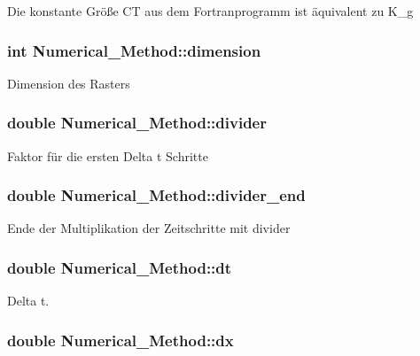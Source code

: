 Die konstante Größe C\-T aus dem Fortranprogramm ist äquivalent zu K\-\_\-g \hypertarget{classNumerical__Method_ae867f42bb0ab0d0bdfdc7d8301c3f45f}{
\subsubsection[{dimension}]{\setlength{\rightskip}{0pt plus 5cm}int Numerical\-\_\-\-Method\-::dimension}}\label{classNumerical__Method_ae867f42bb0ab0d0bdfdc7d8301c3f45f}
Dimension des Rasters \hypertarget{classNumerical__Method_a9767068bb9f5f20c83567f6c9c2ba314}{
\subsubsection[{divider}]{\setlength{\rightskip}{0pt plus 5cm}double Numerical\-\_\-\-Method\-::divider}}\label{classNumerical__Method_a9767068bb9f5f20c83567f6c9c2ba314}
Faktor für die ersten Delta t Schritte \hypertarget{classNumerical__Method_a914fcf77b93b98de47e5535dde982f6b}{
\subsubsection[{divider\-\_\-end}]{\setlength{\rightskip}{0pt plus 5cm}double Numerical\-\_\-\-Method\-::divider\-\_\-end}}\label{classNumerical__Method_a914fcf77b93b98de47e5535dde982f6b}
Ende der Multiplikation der Zeitschritte mit divider \hypertarget{classNumerical__Method_a7eae91e02cf957aa4b702ebba91ce859}{
\subsubsection[{dt}]{\setlength{\rightskip}{0pt plus 5cm}double Numerical\-\_\-\-Method\-::dt}}\label{classNumerical__Method_a7eae91e02cf957aa4b702ebba91ce859}
Delta t. \hypertarget{classNumerical__Method_a3787608790a9dbe0dd9d4d27aafa6008}{
\subsubsection[{dx}]{\setlength{\rightskip}{0pt plus 5cm}double Numerical\-\_\-\-Method\-::dx}}\label{classNumerical__Method_a3787608790a9dbe0dd9d4d27aafa6008}
